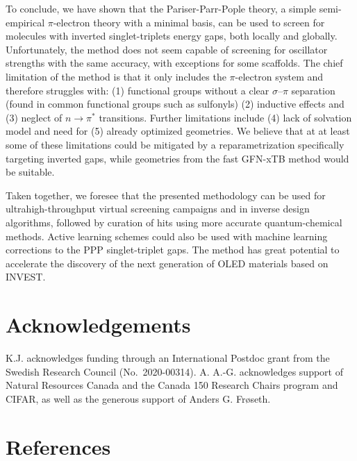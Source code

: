 \documentclass[
  number,
  3p]{elsarticle}
\begin{document}
To conclude, we have shown that the Pariser-Parr-Pople theory, a simple
semi-empirical \(\pi\)-electron theory with a minimal basis, can be used
to screen for molecules with inverted singlet-triplets energy gaps, both
locally and globally. Unfortunately, the method does not seem capable of
screening for oscillator strengths with the same accuracy, with
exceptions for some scaffolds. The chief limitation of the method is
that it only includes the \(\pi\)-electron system and therefore
struggles with: (1) functional groups without a clear
\(\sigma\)--\(\pi\) separation (found in common functional groups such
as sulfonyls) (2) inductive effects and (3) neglect of
\(n \rightarrow \pi^*\) transitions. Further limitations include (4)
lack of solvation model and need for (5) already optimized geometries.
We believe that at at least some of these limitations could be mitigated
by a reparametrization specifically targeting inverted gaps, while
geometries from the fast GFN-xTB method would be suitable.

Taken together, we foresee that the presented methodology can be used
for ultrahigh-throughput virtual screening campaigns and in inverse
design algorithms, followed by curation of hits using more accurate
quantum-chemical methods. Active learning schemes could also be used
with machine learning corrections to the PPP singlet-triplet gaps. The
method has great potential to accelerate the discovery of the next
generation of OLED materials based on INVEST.

\hypertarget{acknowledgements}{%
\section{Acknowledgements}\label{acknowledgements}}

K.J. acknowledges funding through an International Postdoc grant from
the Swedish Research Council (No.~2020-00314). A. A.-G. acknowledges
support of Natural Resources Canada and the Canada 150 Research Chairs
program and CIFAR, as well as the generous support of Anders G. Frøseth.

\hypertarget{references}{%
\section{References}\label{references}}
\end{document}
